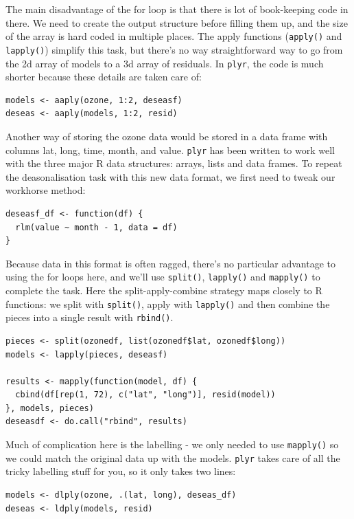 \documentclass[letterpage]{scrartcl}
\newcommand{\f}[1]{\lstinline!#1()!}
\newcommand{\plyr}{{\tt plyr}\xspace}
\begin{document}
The main disadvantage of the for loop is that there is lot of book-keeping code in there.  We need to create the output structure before filling them up, and the size of the array is hard coded in multiple places.  The apply functions (\f{apply} and \f{lapply}) simplify this task, but there's no way straightforward way to go from the 2d array of models to a 3d array of residuals. In \plyr, the code is much shorter because these details are taken care of:

\begin{verbatim}
models <- aaply(ozone, 1:2, deseasf)
deseas <- aaply(models, 1:2, resid)
\end{verbatim}

Another way of storing the ozone data would be stored in a data frame with columns lat, long, time, month, and value.  \plyr has been written to work well with the three major R data structures: arrays, lists and data frames.  To repeat the deasonalisation task with this new data format, we first need to tweak our workhorse method:

\begin{verbatim}
deseasf_df <- function(df) {
  rlm(value ~ month - 1, data = df)
}
\end{verbatim}

Because data in this format is often ragged, there's no particular advantage to using the for loops here, and we'll use \f{split}, \f{lapply} and \f{mapply} to complete the task.  Here the split-apply-combine strategy maps closely to R functions: we split with \f{split}, apply with \f{lapply} and then combine the pieces into a single result with \f{rbind}.

\begin{verbatim}
pieces <- split(ozonedf, list(ozonedf$lat, ozonedf$long))
models <- lapply(pieces, deseasf)

results <- mapply(function(model, df) {
  cbind(df[rep(1, 72), c("lat", "long")], resid(model))
}, models, pieces)
deseasdf <- do.call("rbind", results)
\end{verbatim}

Much of complication here is the labelling - we only needed to use \f{mapply} so we could match the original data up with the models. \plyr takes care of all the tricky labelling stuff for you, so it only takes two lines:

\begin{verbatim}
models <- dlply(ozone, .(lat, long), deseas_df)
deseas <- ldply(models, resid)
\end{verbatim}
\end{document}
